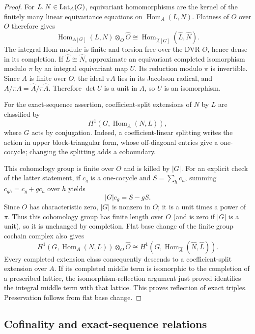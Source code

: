 \begin{proof}
For $L,N\in\operatorname{Lat}_A(G)$, equivariant homomorphisms are the kernel
of the finitely many linear equivariance equations on
$\operatorname{Hom}_A(L,N)$.  Flatness of $\widehat O$ over $O$
therefore gives
\begin{equation}\label{eq:completion-hom-base-change}
 \operatorname{Hom}_{A[G]}(L,N)\otimes_O\widehat O
 \cong
 \operatorname{Hom}_{\widehat A[G]}(\widehat L,\widehat N).
\end{equation}
The integral Hom module is finite and torsion-free over the DVR
$O$, hence dense in its completion.  If $\widehat L\cong\widehat N$,
approximate an equivariant completed isomorphism modulo $\pi$ by an
integral equivariant map $U$.  Its reduction modulo $\pi$ is
invertible.  Since $A$ is finite over $O$, the ideal $\pi A$ lies in
its Jacobson radical, and $A/\pi A=\widehat A/\pi\widehat A$.
Therefore $\det U$ is a unit in $A$, so $U$ is an isomorphism.

For the exact-sequence assertion, coefficient-split extensions of
$N$ by $L$ are classified by
\[
 H^1\!\left(G,\operatorname{Hom}_A(N,L)\right),
\]
where $G$ acts by conjugation.  Indeed, a coefficient-linear
splitting writes the action in upper block-triangular form, whose
off-diagonal entries give a one-cocycle; changing the splitting
adds a coboundary.

This cohomology group is finite over $O$ and is killed by $|G|$.
For an explicit check of the latter statement, if $c_g$ is a
one-cocycle and $S=\sum_hc_h$, summing
$c_{gh}=c_g+gc_h$ over $h$ yields
\[
 |G|c_g=S-gS.
\]
Since $O$ has characteristic zero, $|G|$ is nonzero in $O$; it is
a unit times a power of $\pi$.  Thus this cohomology group has finite
length over $O$ (and is zero if $|G|$ is a unit), so it is unchanged
by completion.  Flat base change of the finite group cochain complex
also gives
\[
 H^1\!\left(G,\operatorname{Hom}_A(N,L)\right)\otimes_O\widehat O
 \cong
 H^1\!\left(G,
       \operatorname{Hom}_{\widehat A}(\widehat N,\widehat L)
       \right).
\]
Every completed extension class consequently descends to a
coefficient-split extension over $A$.  If its completed middle
term is isomorphic to the completion of a prescribed lattice,
the isomorphism-reflection argument just proved identifies the
integral middle term with that lattice.  This proves reflection
of exact triples.  Preservation follows from flat base change.
\end{proof}

\subsection{Cofinality and exact-sequence relations}

